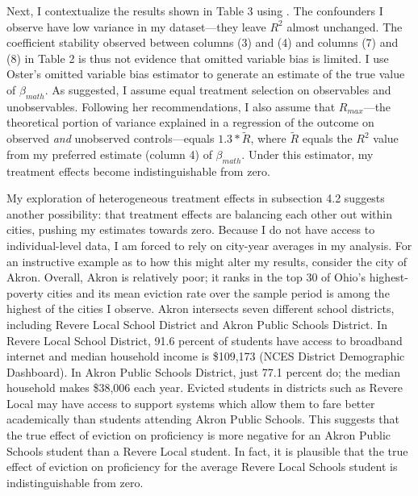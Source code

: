 \documentclass[12pt]{article}
\begin{document}
Next, I contextualize the results shown in Table 3 using \cite{oster_unobservable_2019}. The confounders I observe have low variance in my dataset—they leave $R^2$ almost unchanged. The coefficient stability observed between columns (3) and (4) and columns (7) and (8) in Table 2 is thus not evidence that omitted variable bias is limited. I use Oster's omitted variable bias estimator to generate an estimate of the true value of $\beta_{math}$. As suggested, I assume equal treatment selection on observables and unobservables. Following her recommendations, I also assume that $R_{max}$—the theoretical portion of  variance explained in a regression of the outcome on observed \textit{and} unobserved controls—equals $1.3 * \tilde{R}$, where $\tilde{R}$ equals the $R^2$ value from my preferred estimate (column 4) of $\beta_{math}$. Under this estimator, my treatment effects become indistinguishable from zero. 


My exploration of heterogeneous treatment effects in subsection 4.2 suggests another possibility: that treatment effects are balancing each other out within cities, pushing my estimates towards zero. Because I do not have access to individual-level data, I am forced to rely on city-year averages in my analysis. For an instructive example as to how this might alter my results, consider the city of Akron. Overall, Akron is relatively poor; it ranks in the top 30 of Ohio's highest-poverty cities and its mean eviction rate over the sample period is among the highest of the cities I observe. Akron intersects seven different school districts, including Revere Local School District and Akron Public Schools District. In Revere Local School District, 91.6 percent of students have access to broadband internet and median household income is \$109,173 (NCES District Demographic Dashboard). In Akron Public Schools District, just 77.1 percent do; the median household makes \$38,006 each year. Evicted students in districts such as Revere Local may have access to support systems which allow them to fare better academically than students attending Akron Public Schools. This suggests that the true effect of eviction on proficiency is more negative for an Akron Public Schools student than a Revere Local student. In fact, it is plausible that the true effect of eviction on proficiency for the average Revere Local Schools student is indistinguishable from zero. 
\end{document}
